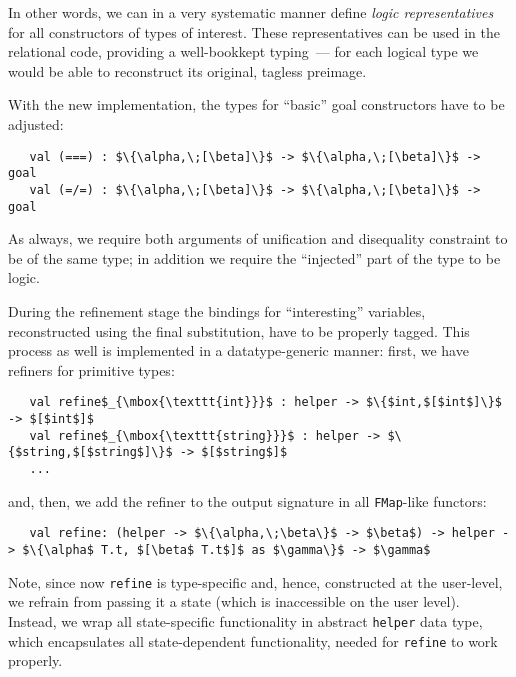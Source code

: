 In other words, we can in a very systematic manner define \emph{logic representatives} for all constructors
of types of interest. These representatives can be used in the relational code, providing a well-bookkept
typing~--- for each logical type we would be able to reconstruct its original, tagless preimage. 

With the new implementation, the types for ``basic'' goal constructors have to be adjusted:

\begin{lstlisting}
   val (===) : $\{\alpha,\;[\beta]\}$ -> $\{\alpha,\;[\beta]\}$ -> goal
   val (=/=) : $\{\alpha,\;[\beta]\}$ -> $\{\alpha,\;[\beta]\}$ -> goal
\end{lstlisting}

As always, we require both arguments of unification and disequality constraint to be of the same type; in addition
we require the ``injected'' part of the type to be logic.

During the refinement stage the bindings for ``interesting'' variables, reconstructed using the final
substitution, have to be properly tagged. This process as well is implemented in a datatype-generic manner:
first, we have refiners for primitive types:

\begin{lstlisting}
   val refine$_{\mbox{\texttt{int}}}$ : helper -> $\{$int,$[$int$]\}$ -> $[$int$]$
   val refine$_{\mbox{\texttt{string}}}$ : helper -> $\{$string,$[$string$]\}$ -> $[$string$]$
   ...  
\end{lstlisting}

and, then, we add the refiner to the output signature in all \lstinline{FMap}-like functors:

\begin{lstlisting}
   val refine: (helper -> $\{\alpha,\;\beta\}$ -> $\beta$) -> helper -> $\{\alpha$ T.t, $[\beta$ T.t$]$ as $\gamma\}$ -> $\gamma$
\end{lstlisting}

Note, since now \lstinline{refine} is type-specific and, hence, constructed at the user-level, we refrain from passing 
it a state (which is inaccessible on the user level). Instead, we wrap all state-specific functionality in 
abstract \lstinline{helper} data type, which encapsulates all state-dependent functionality, needed for \lstinline{refine} 
to work properly.
